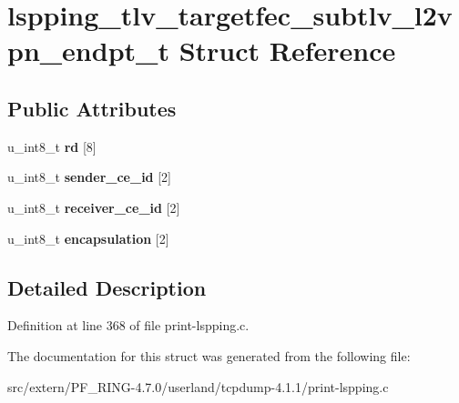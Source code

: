 \hypertarget{structlspping__tlv__targetfec__subtlv__l2vpn__endpt__t}{
\section{lspping\_\-tlv\_\-targetfec\_\-subtlv\_\-l2vpn\_\-endpt\_\-t Struct Reference}
\label{structlspping__tlv__targetfec__subtlv__l2vpn__endpt__t}
}
\subsection*{Public Attributes}
\begin{DoxyCompactItemize}
\item 
\hypertarget{structlspping__tlv__targetfec__subtlv__l2vpn__endpt__t_a7817fc9c8a089d4dc9b226779dce987b}{
u\_\-int8\_\-t {\bfseries rd} \mbox{[}8\mbox{]}}
\label{structlspping__tlv__targetfec__subtlv__l2vpn__endpt__t_a7817fc9c8a089d4dc9b226779dce987b}

\item 
\hypertarget{structlspping__tlv__targetfec__subtlv__l2vpn__endpt__t_a0273c388216f340cff8d9569b6353d6d}{
u\_\-int8\_\-t {\bfseries sender\_\-ce\_\-id} \mbox{[}2\mbox{]}}
\label{structlspping__tlv__targetfec__subtlv__l2vpn__endpt__t_a0273c388216f340cff8d9569b6353d6d}

\item 
\hypertarget{structlspping__tlv__targetfec__subtlv__l2vpn__endpt__t_aacf8041b14bb5f0fd05c971ce1534cb3}{
u\_\-int8\_\-t {\bfseries receiver\_\-ce\_\-id} \mbox{[}2\mbox{]}}
\label{structlspping__tlv__targetfec__subtlv__l2vpn__endpt__t_aacf8041b14bb5f0fd05c971ce1534cb3}

\item 
\hypertarget{structlspping__tlv__targetfec__subtlv__l2vpn__endpt__t_ab8d662a9b6ba6755d2cd87eac7f265b6}{
u\_\-int8\_\-t {\bfseries encapsulation} \mbox{[}2\mbox{]}}
\label{structlspping__tlv__targetfec__subtlv__l2vpn__endpt__t_ab8d662a9b6ba6755d2cd87eac7f265b6}

\end{DoxyCompactItemize}


\subsection{Detailed Description}


Definition at line 368 of file print-\/lspping.c.



The documentation for this struct was generated from the following file:\begin{DoxyCompactItemize}
\item 
src/extern/PF\_\-RING-\/4.7.0/userland/tcpdump-\/4.1.1/print-\/lspping.c\end{DoxyCompactItemize}
